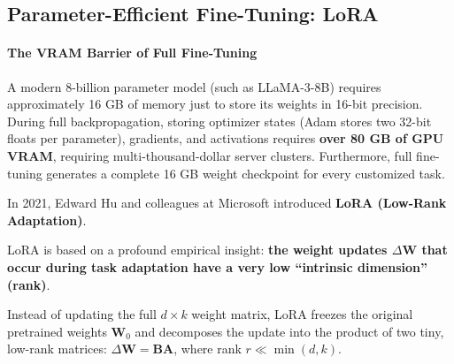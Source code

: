 \subsection{Parameter-Efficient Fine-Tuning: LoRA}\label{subsec:lora}

\paragraph{The VRAM Barrier of Full Fine-Tuning}
A modern 8-billion parameter model (such as LLaMA-3-8B) requires approximately 16 GB of memory just to store its weights in 16-bit precision. During full backpropagation, storing optimizer states (Adam stores two 32-bit floats per parameter), gradients, and activations requires \textbf{over 80 GB of GPU VRAM}, requiring multi-thousand-dollar server clusters. Furthermore, full fine-tuning generates a complete 16 GB weight checkpoint for every customized task.

\begin{keyidea}
In 2021, Edward Hu and colleagues at Microsoft introduced \textbf{LoRA (Low-Rank Adaptation)}. 

LoRA is based on a profound empirical insight: \textbf{the weight updates $\Delta \mathbf{W}$ that occur during task adaptation have a very low ``intrinsic dimension'' (rank)}. 

Instead of updating the full $d \times k$ weight matrix, LoRA freezes the original pretrained weights $\mathbf{W}_0$ and decomposes the update into the product of two tiny, low-rank matrices: $\Delta \mathbf{W} = \mathbf{B} \mathbf{A}$, where rank $r \ll \min(d, k)$.
\end{keyidea}

